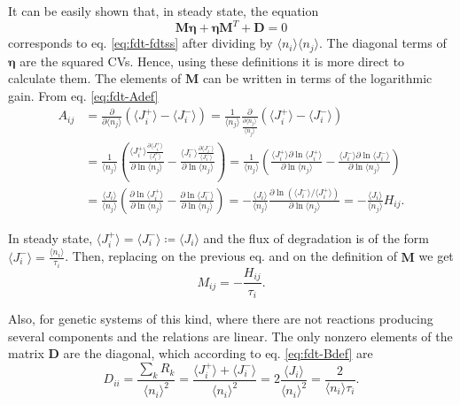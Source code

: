 It can be easily shown that, in steady state, the equation
\begin{equation}
  \label{eq:fdt-fdtss2}
  \mathbf{M\eta}+\mathbf{\eta M}^T+\mathbf{D}=0
\end{equation}
corresponds to eq. \eqref{eq:fdt-fdtss} after dividing by $\langle n_i\rangle\langle n_j\rangle$. The diagonal terms of $\mathbf{\eta}$ are the squared CVs. Hence, using these definitions it is more direct to calculate them. The elements of $\mathbf{M}$ can be written in terms of the logarithmic gain. From eq. \eqref{eq:fdt-Adef}
\begin{equation}
  \begin{split}
    A_{ij}&=\frac{\partial}{\partial \langle n_j\rangle}\left(\langle J_i^+\rangle - \langle J_i^-\rangle\right) = \frac{1}{\langle n_j\rangle}\frac{\partial}{\frac{\partial \langle n_j\rangle}{\langle n_j\rangle}}\left(\langle J_i^+\rangle - \langle J_i^-\rangle\right)\\
    &=\frac{1}{\langle n_j\rangle}\left(\frac{\langle J_i^+\rangle\frac{\partial \langle J_i^+\rangle}{\langle J_i^+\rangle}}{\partial\ln \langle n_j\rangle} - \frac{\langle  J_i^-\rangle\frac{\partial \langle J_i^-\rangle}{\langle J_i^-\rangle}}{\partial\ln \langle n_j\rangle} \right) = \frac{1}{\langle n_j\rangle}\left(\frac{\langle J_i^+\rangle \partial\ln\langle J_i^+\rangle}{\partial\ln \langle n_j\rangle} - \frac{\langle  J_i^-\rangle\partial\ln\langle J_i^-\rangle}{\partial\ln \langle n_j\rangle} \right)\\
    &=\frac{\langle J_i\rangle}{\langle n_j\rangle}\left(\frac{\partial\ln\langle J_i^+\rangle}{\partial\ln \langle n_j\rangle} - \frac{\partial\ln\langle J_i^-\rangle}{\partial\ln \langle n_j\rangle} \right) =-\frac{\langle J_i\rangle}{\langle n_j\rangle}\frac{\partial\ln \left( \langle J_i^-\rangle/\langle J_i^+\rangle \right)}{\partial\ln \langle n_j\rangle} = -\frac{\langle J_i\rangle}{\langle n_j\rangle}H_{ij}.
  \end{split}
\end{equation}

In steady state, $\langle J_i^+\rangle = \langle J_i^-\rangle \coloneqq \langle J_i\rangle$ and the flux of degradation is of the form $\langle J_i^-\rangle = \frac{\langle n_i\rangle}{\tau_i}$. Then, replacing on the previous eq. and on the definition of $\mathbf{M}$ we get
\begin{equation*}
  M_{ij} = -\frac{H_{ij}}{\tau_i}.
\end{equation*}

Also, for genetic systems of this kind, where there are not reactions producing several components and the relations are linear. The only nonzero elements of the matrix $\mathbf{D}$ are the diagonal, which according to eq. \eqref{eq:fdt-Bdef} are
\begin{equation*}
 D_{ii} = \frac{\sum_k R_k}{\langle n_i\rangle^2} =  \frac{\langle J_i^+\rangle + \langle J_i^-\rangle}{\langle n_i\rangle^2} = 2\frac{\langle J_i\rangle}{\langle n_i\rangle^2} = \frac{2}{\langle n_i\rangle\tau_i}.
\end{equation*}

